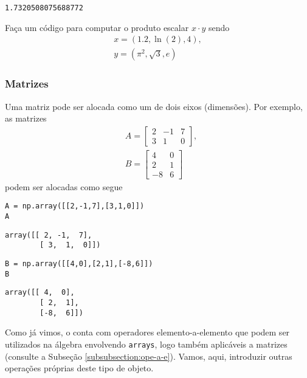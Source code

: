 \begin{verbatim}
1.7320508075688772
\end{verbatim}

\begin{exr}
  Faça um código para computar o produto escalar $x\cdot y$ sendo
  \begin{gather}
    x = (1.2, \ln(2), 4),\\
    y = (\pi^2, \sqrt{3}, e)
  \end{gather}
\end{exr}


\subsubsection{Matrizes}\label{sec_alglin}

Uma matriz pode ser alocada como um {\PYTHONnumpyDOTarray} de dois eixos (dimensões). Por exemplo, as matrizes
\begin{align}
  &A =
  \begin{bmatrix}
    2 & -1 & 7\\
    3 & 1 & 0
  \end{bmatrix},\label{sec_alglin:eq:A}\\
  &B =
  \begin{bmatrix}
    4 & 0\\
    2 & 1\\
   -8 & 6
  \end{bmatrix}\label{sec_alglin:eq:B}
\end{align}
podem ser alocadas como segue

\begin{lstlisting}
A = np.array([[2,-1,7],[3,1,0]])
A
\end{lstlisting}

\begin{verbatim}
array([[ 2, -1,  7],
        [ 3,  1,  0]])
\end{verbatim}

\begin{lstlisting}
B = np.array([[4,0],[2,1],[-8,6]])
B
\end{lstlisting}

\begin{verbatim}
array([[ 4,  0],
        [ 2,  1],
        [-8,  6]])
\end{verbatim}

Como já vimos, o {\numpy} conta com operadores elemento-a-elemento que podem ser utilizados na álgebra envolvendo \texttt{arrays}, logo também aplicáveis a matrizes (consulte a Subseção \ref{subsubsection:ope-a-e}). Vamos, aqui, introduzir outras operações próprias deste tipo de objeto.

